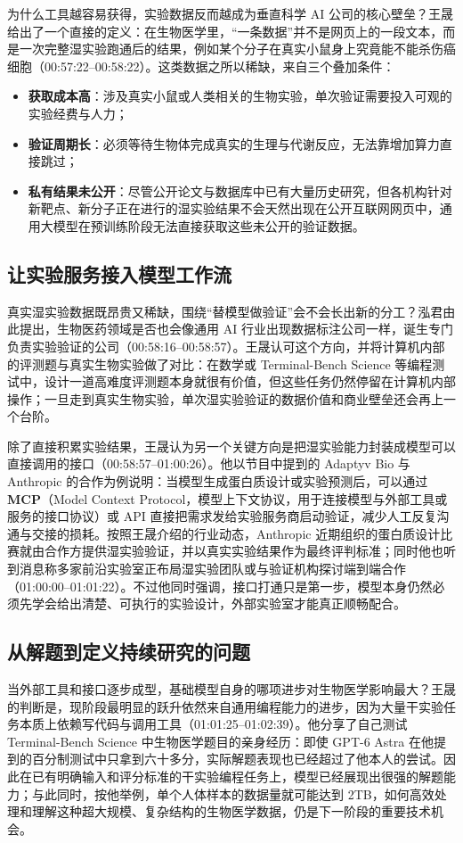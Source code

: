\documentclass[UTF8,a4paper,11pt,fontset=fandol]{ctexart}
\begin{document}
为什么工具越容易获得，实验数据反而越成为垂直科学 AI 公司的核心壁垒？王晟给出了一个直接的定义：在生物医学里，“一条数据”并不是网页上的一段文本，而是一次完整湿实验跑通后的结果，例如某个分子在真实小鼠身上究竟能不能杀伤癌细胞（00:57:22–00:58:22）。这类数据之所以稀缺，来自三个叠加条件：
\begin{itemize}
\item \textbf{获取成本高}：涉及真实小鼠或人类相关的生物实验，单次验证需要投入可观的实验经费与人力；
\item \textbf{验证周期长}：必须等待生物体完成真实的生理与代谢反应，无法靠增加算力直接跳过；
\item \textbf{私有结果未公开}：尽管公开论文与数据库中已有大量历史研究，但各机构针对新靶点、新分子正在进行的湿实验结果不会天然出现在公开互联网网页中，通用大模型在预训练阶段无法直接获取这些未公开的验证数据。
\end{itemize}

\subsection{让实验服务接入模型工作流}
真实湿实验数据既昂贵又稀缺，围绕“替模型做验证”会不会长出新的分工？泓君由此提出，生物医药领域是否也会像通用 AI 行业出现数据标注公司一样，诞生专门负责实验验证的公司（00:58:16–00:58:57）。王晟认可这个方向，并将计算机内部的评测题与真实生物实验做了对比：在数学或 Terminal-Bench Science 等编程测试中，设计一道高难度评测题本身就很有价值，但这些任务仍然停留在计算机内部操作；一旦走到真实生物实验，单次湿实验验证的数据价值和商业壁垒还会再上一个台阶。

除了直接积累实验结果，王晟认为另一个关键方向是把湿实验能力封装成模型可以直接调用的接口（00:58:57–01:00:26）。他以节目中提到的 Adaptyv Bio 与 Anthropic 的合作为例说明：当模型生成蛋白质设计或实验预测后，可以通过 \textbf{MCP}（Model Context Protocol，模型上下文协议，用于连接模型与外部工具或服务的接口协议）或 API 直接把需求发给实验服务商启动验证，减少人工反复沟通与交接的损耗。按照王晟介绍的行业动态，Anthropic 近期组织的蛋白质设计比赛就由合作方提供湿实验验证，并以真实实验结果作为最终评判标准；同时他也听到消息称多家前沿实验室正布局湿实验团队或与验证机构探讨端到端合作（01:00:00–01:01:22）。不过他同时强调，接口打通只是第一步，模型本身仍然必须先学会给出清楚、可执行的实验设计，外部实验室才能真正顺畅配合。

\subsection{从解题到定义持续研究的问题}
当外部工具和接口逐步成型，基础模型自身的哪项进步对生物医学影响最大？王晟的判断是，现阶段最明显的跃升依然来自通用编程能力的进步，因为大量干实验任务本质上依赖写代码与调用工具（01:01:25–01:02:39）。他分享了自己测试 Terminal-Bench Science 中生物医学题目的亲身经历：即使 GPT-6 Astra 在他提到的百分制测试中只拿到六十多分，实际解题表现也已经超过了他本人的尝试。因此在已有明确输入和评分标准的干实验编程任务上，模型已经展现出很强的解题能力；与此同时，按他举例，单个人体样本的数据量就可能达到 2TB，如何高效处理和理解这种超大规模、复杂结构的生物医学数据，仍是下一阶段的重要技术机会。
\end{document}

